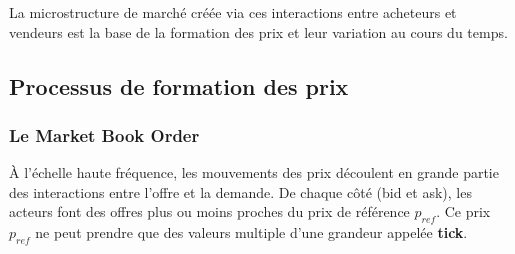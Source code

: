 \documentclass[12pt,a4paper]{article}
\theoremstyle{definition}
\theoremstyle{remark}
\begin{document}
    La microstructure de marché créée via ces interactions entre acheteurs et vendeurs est la base de la formation des prix et leur variation au cours du temps.

    \subsection{Processus de formation des prix}
    \subsubsection{Le Market Book Order}
    À l'échelle haute fréquence, les mouvements des prix découlent en grande partie des interactions entre l'offre et la demande. De chaque côté (bid et ask), les acteurs font des offres plus ou moins proches du prix de référence $p_{ref}$. Ce prix $p_{ref}$ ne peut prendre que des valeurs multiple d'une grandeur appelée \textbf{tick}. 
    
\end{document}

